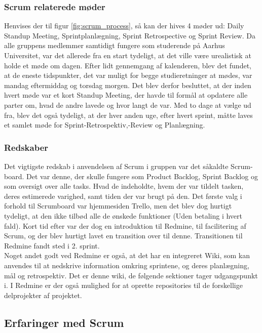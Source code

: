 \documentclass[a4paper,12pt,fleqn,oneside]{article}
\begin{document}
\subsubsection{Scrum relaterede møder}
Henvises der til figur \ref{fig:scrum_process}, så kan der hives 4 møder ud: Daily Standup Meeting, Sprintplanlægning, Sprint Retrospective og Sprint Review. Da alle gruppens medlemmer samtidigt fungere som studerende på Aarhus Universitet, var det allerede fra en start tydeligt, at det ville være urealistisk at holde et møde om dagen. Efter lidt gennemgang af kalenderen, blev det fundet, at de eneste tidspunkter, det var muligt for begge studieretninger at mødes, var mandag eftermiddag og torsdag morgen. Det blev derfor besluttet, at der inden hvert møde var et kort Standup Meeting, der havde til formål at opdatere alle parter om, hvad de andre lavede og hvor langt de var. Med to dage at vælge ud fra, blev det også tydeligt, at der hver anden uge, efter hvert sprint, måtte laves et samlet møde for Sprint-Retrospektiv,-Review og Planlægning. 

\subsubsection{Redskaber} \label{scrum_tools}
Det vigtigste redskab i anvendelsen af Scrum i gruppen var det såkaldte Scrum-board. Det var denne, der skulle fungere som Product Backlog, Sprint Backlog og som oversigt over alle tasks. Hvad de indeholdte, hvem der var tildelt tasken, deres estimerede varighed, samt tiden der var brugt på den. Det første valg i forhold til Scrumboard var hjemmesiden Trello, men det blev dog hurtigt tydeligt, at den ikke tilbød alle de ønskede funktioner (Uden betaling i hvert fald). Kort tid efter var der dog en introduktion til Redmine, til facilitering af Scrum, og der blev hurtigt lavet en transition over til denne. Transitionen til Redmine fandt sted i 2. sprint. 
\\Noget andet godt ved Redmine er også, at det har en integreret Wiki, som kan anvendes til at nedskrive information omkring sprintene, og deres planlægning, mål og retrospektiv. Det er denne wiki, de følgende sektioner tager udgangspunkt i. I Redmine er der også mulighed for at oprette repositories til de forskellige delprojekter af projektet.

\subsection{Erfaringer med Scrum}\label{sec:experiences_w_scrum}
\end{document}
